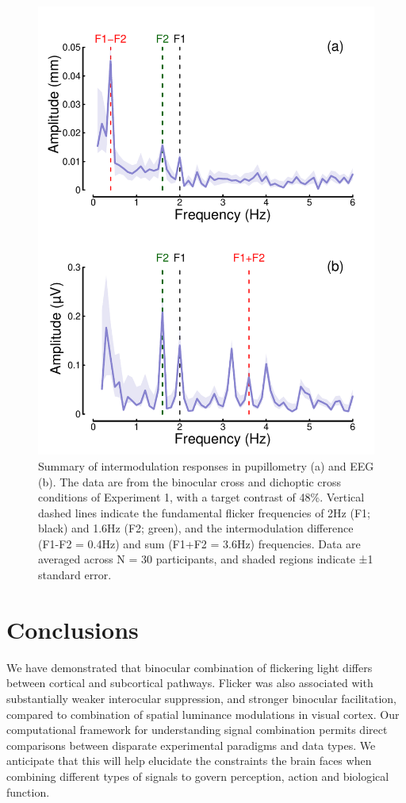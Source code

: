 \documentclass[
]{article}
\begin{document}
\begin{figure}

{\centering \includegraphics[width=0.5\linewidth]{Figures/IMresponse} 

}

\caption{Summary of intermodulation responses in pupillometry (a) and EEG (b). The data are from the binocular cross and dichoptic cross conditions of Experiment 1, with a target contrast of 48\%. Vertical dashed lines indicate the fundamental flicker frequencies of 2Hz (F1; black) and 1.6Hz (F2; green), and the intermodulation difference (F1-F2 = 0.4Hz) and sum (F1+F2 = 3.6Hz) frequencies. Data are averaged across N = 30 participants, and shaded regions indicate ±1 standard error.}\label{fig:IMfig}
\end{figure}

\hypertarget{conclusions}{%
\section{Conclusions}\label{conclusions}}

We have demonstrated that binocular combination of flickering light differs between cortical and subcortical pathways. Flicker was also associated with substantially weaker interocular suppression, and stronger binocular facilitation, compared to combination of spatial luminance modulations in visual cortex. Our computational framework for understanding signal combination permits direct comparisons between disparate experimental paradigms and data types. We anticipate that this will help elucidate the constraints the brain faces when combining different types of signals to govern perception, action and biological function.
\end{document}

